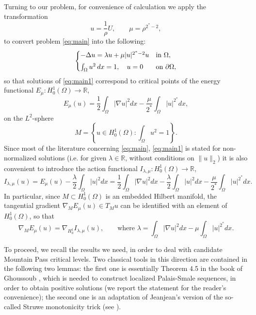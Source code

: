 \documentclass[10pt]{article}
\newcommand{\R}{\mathbb{R}}
\theoremstyle{definition}
\numberwithin{equation}{section}
\begin{document}
Turning to our problem, for convenience of calculation we  apply the transformation
\begin{equation}\label{eq:changeofvariables}
u=\frac{1}{\rho}U,\qquad \mu=\rho^{2^{*}-2},
\end{equation}
to convert problem \eqref{eq:main} into the following:
\begin{equation}\label{eq:main1}
\begin{cases}
-\Delta u = \lambda u + \mu |u|^{2^{*}-2}u  & \text{in }\Omega,\smallskip\\
\int_\Omega u^2\,dx = 1, \quad u=0  & \text{on }\partial\Omega,
\end{cases}
\end{equation}
so that solutions of \eqref{eq:main1} correspond to critical points of the energy functional $E_{\mu}:H^{1}_{0}(\Omega)\rightarrow \mathbb{R}$, 
\begin{equation}\label{func:main}
E_{\mu}(u)=\frac{1}{2}\int_{\Omega}|\nabla u|^{2}dx-\frac{\mu}{2^{*}}\int_{\Omega}|u|^{2^{*}}dx,
\end{equation}
on the $L^{2}$-sphere
\begin{equation}\label{manifold:1}
M=\left\{u\in H^{1}_{0}(\Omega): \int_{\Omega} u^{2}=1\right\}.
\end{equation}
Since most of the literature concerning \eqref{eq:main}, \eqref{eq:main1} is stated for non-normalized 
solutions (i.e. for given $\lambda\in\R$, without conditions on $\|u\|_2$) it is also convenient to 
introduce the action functional $I_{\lambda,\mu}:H^{1}_{0}(\Omega)\rightarrow \mathbb{R}$, 
\begin{equation}\label{func:auto}
I_{\lambda,\mu}(u)= E_\mu(u) -\frac{\lambda}{2}\int_{\Omega}|u|^{2}dx  = \frac{1}{2}\int_{\Omega}|\nabla u|^{2}dx-\frac{\lambda}{2}\int_{\Omega}|u|^{2}dx-\frac{\mu}{2^{*}}\int_{\Omega}|u|^{2^{*}}dx.
\end{equation}
In particular, since $M\subset H^1_0(\Omega)$ is an embedded Hilbert manifold, the tangential gradient 
$\nabla_M E_\mu(u) \in T_Mu$ can be identified with an element of $H^1_0(\Omega)$, so that
\begin{equation}\label{eq:def of nabla_M E}
\nabla_M E_\mu(u) = \nabla_{H^1_0} I_{\lambda,\mu}(u),
\qquad\text{where }
\lambda = \int_{\Omega}|\nabla u|^{2}dx-\mu\int_{\Omega}|u|^{2^{*}}dx.
\end{equation}

To proceed, we recall the results we need, in order to deal with candidate Mountain Pass critical levels.
Two classical tools in this direction are contained in the following two lemmas: the first one is 
essentially Theorem 4.5 in the book of Ghoussoub \cite{MR1251958}, which is needed to construct 
localized Palais-Smale sequences, in order to obtain positive solutions (we report the statement 
for the reader's convenience); the second one is an adaptation of Jeanjean's version \cite{JJ_BPS} 
of the so-called Struwe monotonicity trick (see \cite{MR970849,MR926524}).
\end{document}
